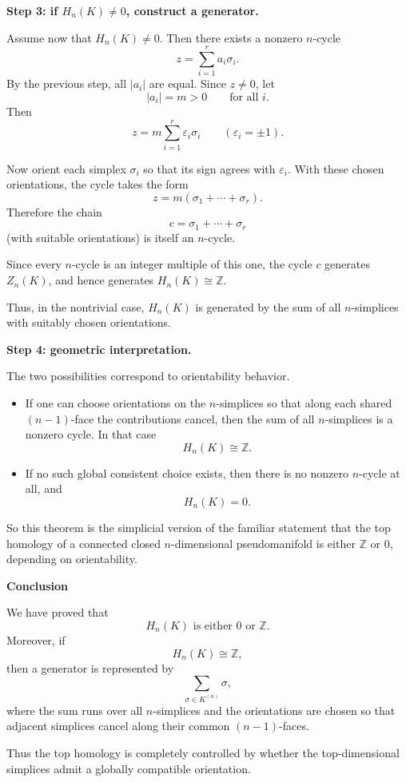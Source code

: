 \begin{solution}
\textbf{Step 3: if \(H_n(K)\neq 0\), construct a generator.}

Assume now that \(H_n(K)\neq 0\). Then there exists a nonzero \(n\)-cycle
\[
z=\sum_{i=1}^r a_i\sigma_i.
\]
By the previous step, all \(|a_i|\) are equal. Since \(z\neq 0\), let
\[
|a_i|=m>0
\qquad\text{for all } i.
\]
Then
\[
z=m\sum_{i=1}^r \varepsilon_i\sigma_i
\qquad (\varepsilon_i=\pm 1).
\]

Now orient each simplex \(\sigma_i\) so that its sign agrees with \(\varepsilon_i\). With these chosen orientations, the cycle takes the form
\[
z=m(\sigma_1+\cdots+\sigma_r).
\]
Therefore the chain
\[
c=\sigma_1+\cdots+\sigma_r
\]
(with suitable orientations) is itself an \(n\)-cycle.

Since every \(n\)-cycle is an integer multiple of this one, the cycle \(c\) generates \(Z_n(K)\), and hence generates \(H_n(K)\cong \mathbb Z\).

Thus, in the nontrivial case, \(H_n(K)\) is generated by the sum of all \(n\)-simplices with suitably chosen orientations.

\par

\textbf{Step 4: geometric interpretation.}

The two possibilities correspond to orientability behavior.

\begin{itemize}
	\item If one can choose orientations on the \(n\)-simplices so that along each shared \((n-1)\)-face the contributions cancel, then the sum of all \(n\)-simplices is a nonzero cycle. In that case
	\[
	H_n(K)\cong \mathbb Z.
	\]

	\item If no such global consistent choice exists, then there is no nonzero \(n\)-cycle at all, and
	\[
	H_n(K)=0.
	\]
\end{itemize}

So this theorem is the simplicial version of the familiar statement that the top homology of a connected closed \(n\)-dimensional pseudomanifold is either \(\mathbb Z\) or \(0\), depending on orientability.


\medskip
\noindent\textbf{Conclusion}\par
\smallskip


We have proved that
\[
\boxed{H_n(K)\text{ is either }0\text{ or }\mathbb Z.}
\]
Moreover, if
\[
H_n(K)\cong \mathbb Z,
\]
then a generator is represented by
\[
\sum_{\sigma\in K^{(n)}} \sigma,
\]
where the sum runs over all \(n\)-simplices and the orientations are chosen so that adjacent simplices cancel along their common \((n-1)\)-faces.

Thus the top homology is completely controlled by whether the top-dimensional simplices admit a globally compatible orientation.
\end{solution}

